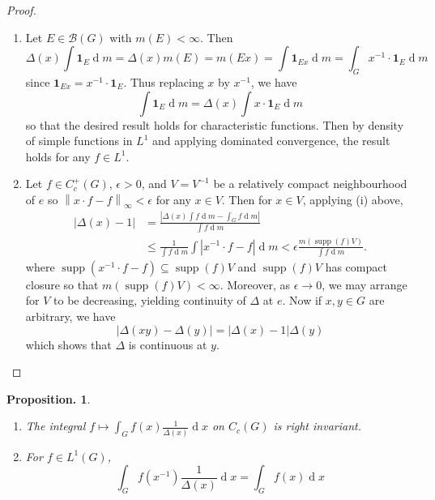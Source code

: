 \documentclass[11pt, a4paper]{memoir}
\newcommand{\norm}[1]{\ensuremath{\left\lVert#1\right\rVert}}
\theoremstyle{change}
\newtheorem{proposition}[theorem]{Proposition.}
\theoremstyle{plain}
\theoremstyle{nonumberplain}
\newtheorem{proof}{Proof}
\DeclareMathOperator{\supp}{supp}
\renewcommand{\d}[1]{\ensuremath{\operatorname{d}\!{#1}}}
\newcommand{\idc}[1]{\ensuremath{\mathbf{1}_{#1}}}
\numberwithin{equation}{section}
\begin{document}
\begin{proof}
    \begin{enumerate}[nl,r]
        \item Let $E\in\mathcal{B}(G)$ with $m(E)<\infty$.
            Then
            \begin{equation*}
                \Delta(x)\int \idc{E}\d{m}=\Delta(x)m(E)=m(Ex)=\int \idc{Ex}\d{m}=\int_G x^{-1}\cdot \idc{E}\d{m}
            \end{equation*}
            since $\idc{Ex}=x^{-1}\cdot\idc{E}$.
            Thus replacing $x$ by $x^{-1}$, we have
            \begin{equation*}
                \int\idc{E}\d{m}=\Delta(x)\int x\cdot \idc{E}\d{m}
            \end{equation*}
            so that the desired result holds for characteristic functions.
            Then by density of simple functions in $L^1$ and applying dominated convergence, the result holds for any $f\in L^1$.
        \item Let $f\in C_c^+(G)$, $\epsilon>0$, and $V=V^{-1}$ be a relatively compact neighbourhood of $e$ so $\norm{x\cdot f-f}_\infty<\epsilon$ for any $x\in V$.
            Then for $x\in V$, applying (i) above,
            \begin{align*}
                |\Delta(x)-1|&=\frac{|\Delta(x)\int f\d{m}-\int_Gf\d{m}|}{\int f\d{m}}\\
                             &\leq\frac{1}{\int f\d{m}}\int|x^{-1}\cdot f-f|\d{m}<\epsilon\frac{m(\supp(f)V)}{\int f\d{m}}.
            \end{align*}
            where $\supp(x^{-1}\cdot f-f)\subseteq\supp(f)V$ and $\supp(f)V$ has compact closure so that $m(\supp(f)V)<\infty$.
            Moreover, as $\epsilon\to 0$, we may arrange for $V$ to be decreasing, yielding continuity of $\Delta$ at $e$.
            Now if $x,y\in G$ are arbitrary, we have
            \begin{equation*}
                |\Delta(xy)-\Delta(y)|=|\Delta(x)-1|\Delta(y)
            \end{equation*}
            which shows that $\Delta$ is continuous at $y$.
    \end{enumerate}
\end{proof}
\begin{proposition}
    \begin{enumerate}[nl,r]
        \item The integral $f\mapsto\int_G f(x)\frac{1}{\Delta(x)}\d{x}$ on $C_c(G)$ is right invariant.
        \item For $f\in L^1(G)$,
            \begin{equation*}
                \int_G f(x^{-1})\frac{1}{\Delta(x)}\d{x}=\int_G f(x)\d{x}
            \end{equation*}
    \end{enumerate}
\end{proposition}
\end{document}
